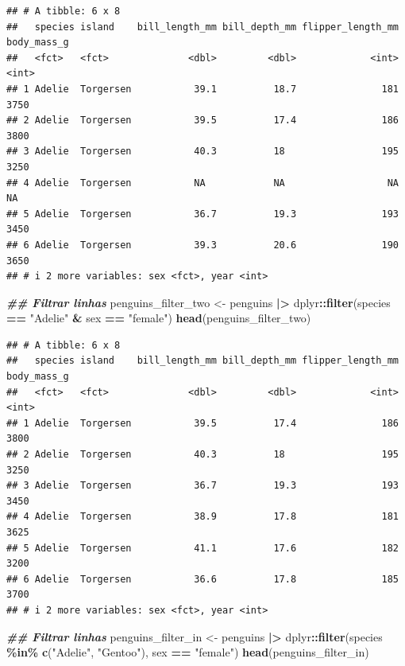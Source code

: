 \documentclass[
]{article}
\newenvironment{Shaded}{\begin{snugshade}}{\end{snugshade}}
\newcommand{\DocumentationTok}[1]{\textcolor[rgb]{0.56,0.35,0.01}{\textbf{\textit{#1}}}}
\newcommand{\FunctionTok}[1]{\textcolor[rgb]{0.13,0.29,0.53}{\textbf{#1}}}
\newcommand{\NormalTok}[1]{#1}
\newcommand{\OtherTok}[1]{\textcolor[rgb]{0.56,0.35,0.01}{#1}}
\newcommand{\SpecialCharTok}[1]{\textcolor[rgb]{0.81,0.36,0.00}{\textbf{#1}}}
\newcommand{\StringTok}[1]{\textcolor[rgb]{0.31,0.60,0.02}{#1}}
\begin{document}
\begin{verbatim}
## # A tibble: 6 x 8
##   species island    bill_length_mm bill_depth_mm flipper_length_mm body_mass_g
##   <fct>   <fct>              <dbl>         <dbl>             <int>       <int>
## 1 Adelie  Torgersen           39.1          18.7               181        3750
## 2 Adelie  Torgersen           39.5          17.4               186        3800
## 3 Adelie  Torgersen           40.3          18                 195        3250
## 4 Adelie  Torgersen           NA            NA                  NA          NA
## 5 Adelie  Torgersen           36.7          19.3               193        3450
## 6 Adelie  Torgersen           39.3          20.6               190        3650
## # i 2 more variables: sex <fct>, year <int>
\end{verbatim}

\begin{Shaded}
\begin{Highlighting}[]
\DocumentationTok{\#\# Filtrar linhas}
\NormalTok{penguins\_filter\_two }\OtherTok{\textless{}{-}}\NormalTok{ penguins }\SpecialCharTok{|\textgreater{}} 
\NormalTok{    dplyr}\SpecialCharTok{::}\FunctionTok{filter}\NormalTok{(species }\SpecialCharTok{==} \StringTok{"Adelie"} \SpecialCharTok{\&}\NormalTok{ sex }\SpecialCharTok{==} \StringTok{"female"}\NormalTok{)}
\FunctionTok{head}\NormalTok{(penguins\_filter\_two)}
\end{Highlighting}
\end{Shaded}

\begin{verbatim}
## # A tibble: 6 x 8
##   species island    bill_length_mm bill_depth_mm flipper_length_mm body_mass_g
##   <fct>   <fct>              <dbl>         <dbl>             <int>       <int>
## 1 Adelie  Torgersen           39.5          17.4               186        3800
## 2 Adelie  Torgersen           40.3          18                 195        3250
## 3 Adelie  Torgersen           36.7          19.3               193        3450
## 4 Adelie  Torgersen           38.9          17.8               181        3625
## 5 Adelie  Torgersen           41.1          17.6               182        3200
## 6 Adelie  Torgersen           36.6          17.8               185        3700
## # i 2 more variables: sex <fct>, year <int>
\end{verbatim}

\begin{Shaded}
\begin{Highlighting}[]
\DocumentationTok{\#\# Filtrar linhas}
\NormalTok{penguins\_filter\_in }\OtherTok{\textless{}{-}}\NormalTok{ penguins }\SpecialCharTok{|\textgreater{}} 
\NormalTok{    dplyr}\SpecialCharTok{::}\FunctionTok{filter}\NormalTok{(species }\SpecialCharTok{\%in\%} \FunctionTok{c}\NormalTok{(}\StringTok{"Adelie"}\NormalTok{, }\StringTok{"Gentoo"}\NormalTok{),}
\NormalTok{                  sex }\SpecialCharTok{==} \StringTok{"female"}\NormalTok{)}
\FunctionTok{head}\NormalTok{(penguins\_filter\_in)}
\end{Highlighting}
\end{Shaded}
\end{document}

